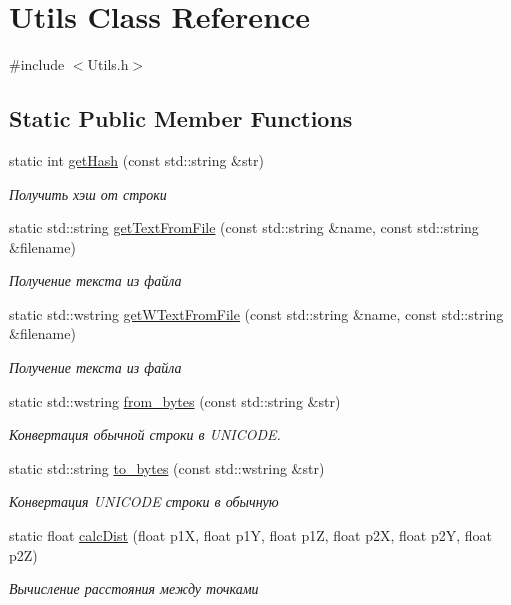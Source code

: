 \hypertarget{class_utils}{}\section{Utils Class Reference}
\label{class_utils}


{\ttfamily \#include $<$Utils.\+h$>$}

\subsection*{Static Public Member Functions}
\begin{DoxyCompactItemize}
\item 
static int \hyperlink{class_utils_aad2252ad39d512678c7a50ff2afc8023}{get\+Hash} (const std\+::string \&str)
\begin{DoxyCompactList}\small\item\em Получить хэш от строки \end{DoxyCompactList}\item 
static std\+::string \hyperlink{class_utils_af2affff9072df7098d91995b4f20efec}{get\+Text\+From\+File} (const std\+::string \&name, const std\+::string \&filename)
\begin{DoxyCompactList}\small\item\em Получение текста из файла \end{DoxyCompactList}\item 
static std\+::wstring \hyperlink{class_utils_a302eaa5ae23297acf44b7baeede450d6}{get\+W\+Text\+From\+File} (const std\+::string \&name, const std\+::string \&filename)
\begin{DoxyCompactList}\small\item\em Получение текста из файла \end{DoxyCompactList}\item 
static std\+::wstring \hyperlink{class_utils_a5b765b02b904d25d17d2f7dca2027b53}{from\+\_\+bytes} (const std\+::string \&str)
\begin{DoxyCompactList}\small\item\em Конвертация обычной строки в U\+N\+I\+C\+O\+DE. \end{DoxyCompactList}\item 
static std\+::string \hyperlink{class_utils_a40b4cc3c2c2ea3140e216e85a252f332}{to\+\_\+bytes} (const std\+::wstring \&str)
\begin{DoxyCompactList}\small\item\em Конвертация U\+N\+I\+C\+O\+DE строки в обычную \end{DoxyCompactList}\item 
static float \hyperlink{class_utils_afcee4a224a1de1ff99565163b1650a29}{calc\+Dist} (float p1X, float p1Y, float p1Z, float p2X, float p2Y, float p2Z)
\begin{DoxyCompactList}\small\item\em Вычисление расстояния между точками \end{DoxyCompactList}\end{DoxyCompactItemize}
